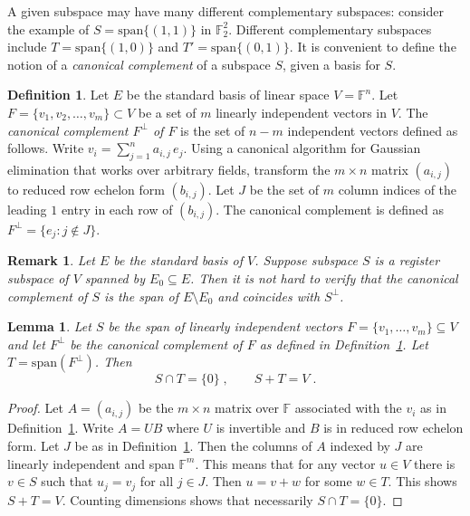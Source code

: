 \documentclass[11pt]{article}
\newtheorem{lemma}[theorem]{Lemma}
\newtheorem{remark}[theorem]{Remark}
\theoremstyle{definition}
\newtheorem{definition}[theorem]{Definition}
\newcommand{\F}{\ensuremath{\mathbb{F}}}
\begin{document}
A given subspace may have many different complementary subspaces: consider the
example of $S = \mathrm{span}\{(1,1) \}$ in $\F_2^2$.
Different complementary subspaces include $T = \mathrm{span}\{(1,0)\}$ and
$T' = \mathrm{span}\{(0,1)\}$.
It is convenient to define the notion of a \emph{canonical complement} of a
subspace $S$, given a basis for $S$.

\begin{definition}
  \label{def:canonical-complement}
  Let $E$ be the standard basis of linear space $V = \F^n$.
  Let $F = \{v_1, v_2, \ldots, v_m\} \subset V$ be a set of $m$ linearly
  independent vectors in $V$.
  The \emph{canonical complement $F^\perp$ of $F$} is the set of $n-m$ independent
  vectors defined as follows.
  Write $v_i = \sum_{j=1}^n a_{i, j}\, e_j$.
	Using a canonical algorithm for Gaussian elimination that works over arbitrary
  fields, transform the $m\times n$ matrix $(a_{i, j})$ to reduced row echelon
  form $(b_{i, j})$.
  Let $J$ be the set of $m$ column indices of the leading $1$ entry in each row
  of $(b_{i, j})$.
  The canonical complement is defined as $F^\perp = \{ e_j : j \not\in J \}$.
\end{definition}

\begin{remark}
  Let $E$ be the standard basis of $V$.
  Suppose subspace $S$ is a register subspace of $V$ spanned by $E_0 \subseteq
  E$.
  Then it is not hard to verify that the canonical complement of $S$ is the span
  of $E\setminus E_0$ and coincides with $S^\perp$.
\end{remark}

\begin{lemma}
  \label{lem:canonical-complement}
  Let $S$ be the span of linearly independent vectors $F = \{v_1,\ldots,v_m \}
  \subseteq V$ and let $F^\perp$ be the canonical complement of $F$ as defined
  in Definition~\ref{def:canonical-complement}.
  Let $T = \mathrm{span}(F^\perp)$.
  Then
  \begin{equation*}
    S \cap T = \{ 0 \}\;, \qquad S + T = V\;.
  \end{equation*}
\end{lemma}

\begin{proof}
  Let $A = (a_{i, j})$ be the $m\times n$ matrix over $\F$ associated with
the   $v_i$ as in Definition~\ref{def:canonical-complement}.
  Write $A = U B$ where $U$ is invertible and $B$ is in reduced row echelon
  form.
  Let $J$ be as in Definition~\ref{def:canonical-complement}.
  Then the columns of $A$ indexed by $J$ are linearly independent and span
  $\F^m$.
  This means that for any vector $u\in V$ there is $v\in S$ such that $u_j =
  v_j$ for all $j\in J$.
  Then $u = v + w$ for some $w \in T$.
  This shows $S + T = V$.
  Counting dimensions shows that necessarily $S\cap T = \{0\}$.
\end{proof}
\end{document}
